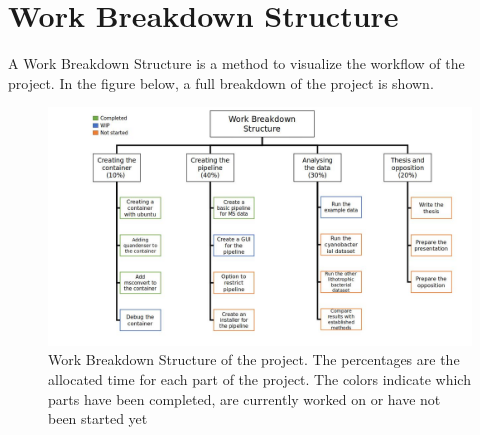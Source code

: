 \section{Work Breakdown Structure}

A Work Breakdown Structure is a method to visualize the workflow of the project. In the figure below, a full breakdown of the project is shown.

\begin{figure}[H]
    \centering
    \includegraphics[width=\textwidth,height=\textheight,keepaspectratio]{Pictures/wbs.jpg}
    \caption{Work Breakdown Structure of the project. The percentages are the allocated time for each part of the project. The colors indicate which parts have been completed, are currently worked on or have not been started yet}
\end{figure}
